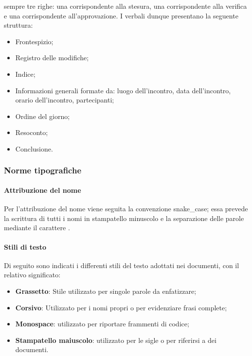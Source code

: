 sempre tre righe: una corrispondente alla stesura, una corrispondente alla verifica e una corrispondente 
all'approvazione. I verbali dunque presentano la seguente struttura:
\begin{itemize}
    \item Frontespizio;
    \item Registro delle modifiche;
    \item Indice;
    \item Informazioni generali formate da: luogo dell'incontro, data dell'incontro, orario dell'incontro, partecipanti;
    \item Ordine del giorno;
    \item Resoconto;
    \item Conclusione.
\end{itemize}

\subsubsection{Norme tipografiche}
\label{ssub:norme_tipografiche}

\paragraph{Attribuzione del nome}
\label{par:attribuzione_nome}

Per l'attribuzione del nome viene seguita la convenzione snake\_case; essa prevede la scrittura di tutti i nomi in 
stampatello minuscolo e la separazione delle parole mediante il carattere .

\paragraph{Stili di testo}
\label{par:stili_testo}

Di seguito sono indicati i differenti stili del testo adottati nei documenti, con il relativo significato:
\begin{itemize}
    \item \textbf{Grassetto}: Stile utilizzato per singole parole da enfatizzare;
    \item \textbf{Corsivo}: Utilizzato per i nomi propri o per evidenziare frasi complete;
    \item \textbf{Monospace}: utilizzato per riportare frammenti di codice;
    \item \textbf{Stampatello maiuscolo}: utilizzato per le sigle o per riferirsi a dei documenti.
\end{itemize}

